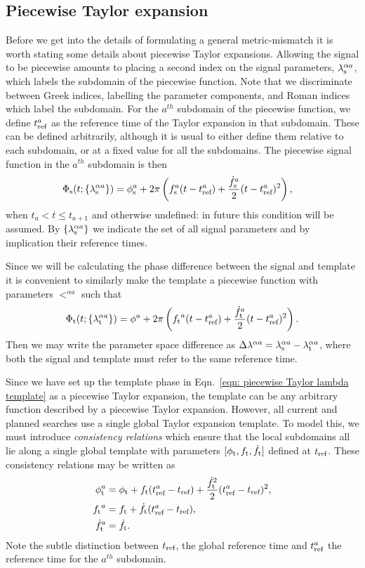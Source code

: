 \documentclass[../full_thesis/full_thesis.tex]{subfiles}
\begin{document}
\subsection{Piecewise Taylor expansion}
Before we get into the details of formulating a general metric-mismatch it is
worth stating some details about piecewise Taylor expansions.
Allowing the signal to be piecewise amounts to placing a second index on the
signal parameters, ${\lambda}_\textrm{s}^{\alpha a}$, which labels the subdomain of the piecewise function.
Note that we discriminate between
Greek indices, labelling the parameter components, and Roman indices which
label the subdomain.
For the $a^{th}$ subdomain of the piecewise function, we define $t_{\textrm{ref}}^{a}$
as the reference time of the Taylor expansion in that subdomain. These can
be defined arbitrarily, although it is usual to either define them
relative to each subdomain, or at a fixed value for all the subdomains.
The piecewise signal function in the $a^{th}$ subdomain is then
\begin{align}
\Phi_{\textrm{s}}(t; \{{\lambda}_\textrm{s}^{\alpha a}\}) & = \phi_{\textrm{s}}^a + 2\pi \left(f_{\textrm{s}}^a (t - t_{\textrm{ref}}^a)
+ \frac{\dot{f}_{\textrm{s}}^a}{2}(t - t_{\textrm{ref}}^a)^{2} \right),
\label{eqn: piecewise Taylor lambda signal}
\end{align}
when $t_{a} < t \le t_{a+1}$ and otherwise undefined: in future this condition will
be assumed.  By $\{{\lambda}_\textrm{s}^{\alpha a}\}$ we indicate the set of all signal
parameters and by implication their reference times.

Since we will be calculating the phase difference between the signal and template
it is convenient to similarly make the template a piecewise function with
parameters $\lt^{\alpha a}$ such that
\begin{align}
\Phi_{\textrm{t}}(t; \{{\lambda}_\textrm{t}^{\alpha a}\}) = \phi^a + 2\pi \left({f_{\textrm{t}}}^a (t - t_{\textrm{ref}}^a)
+ \frac{\dot{f}_{\textrm{t}}^a}{2}(t - t_{\textrm{ref}}^a)^{2} \right).
\label{eqn: piecewise Taylor lambda template}
\end{align}
Then we may write the parameter space difference as
$\Delta\lambda^{\alpha a} = {\lambda}_\textrm{s}^{\alpha a} - {\lambda}_\textrm{t}^{\alpha a}$, where both the signal and
template must refer to the same reference time.

Since we have set up the template phase in Eqn.~\eqref{eqn: piecewise Taylor
lambda template} as a piecewise Taylor expansion, the template can
be any arbitrary function described by a piecewise Taylor expansion. However,
all current and planned searches use a single global Taylor expansion template.
To model this, we must introduce \emph{consistency relations}
which ensure that the local subdomains all lie along a single global template
with parameters $[\phi_{\textrm{t}}, {f_{\textrm{t}}}, \dot{f}_{\textrm{t}}]$ defined at $t_{\textrm{ref}}$. These consistency
relations may be written as
\begin{align}
\begin{split}
\phi_{\textrm{t}}^a & = \phi_{\textrm{t}} + {f_{\textrm{t}}}(t_{\textrm{ref}}^a - t_{\textrm{ref}}) + \frac{\dot{f}_{\textrm{t}}^{2}}{2}(t_{\textrm{ref}}^a - t_{\textrm{ref}})^{2}, \\
{f_{\textrm{t}}}^a & = {f_{\textrm{t}}} + \dot{f}_{\textrm{t}}(t_{\textrm{ref}}^a - t_{\textrm{ref}}), \\
\dot{f}_{\textrm{t}}^a & = \dot{f}_{\textrm{t}}.
\end{split}
\end{align}
Note the subtle distinction between $t_{\textrm{ref}}$, the global reference time and
$t_{\textrm{ref}}^{a}$ the reference time for the $a^{th}$ subdomain.
\end{document}
